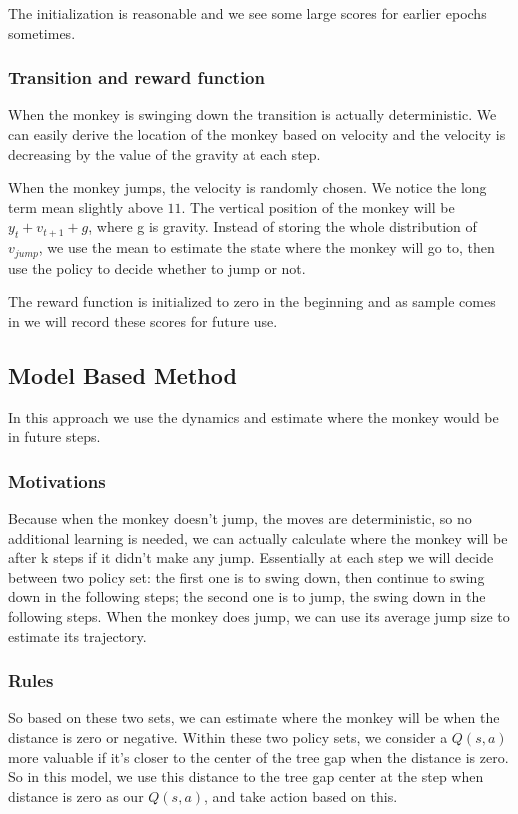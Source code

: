 \documentclass[submit]{harvardml}
\begin{document}
The initialization is reasonable and we see some large scores for earlier epochs sometimes.

\subsubsection{Transition and reward function}
When the monkey is swinging down the transition is actually deterministic. We can easily derive the location of the monkey based on velocity and the velocity is decreasing by the value of the gravity at each step. 

When the monkey jumps, the velocity is randomly chosen. We notice the long term mean slightly above $11$. The vertical position of the monkey will be $y_t + v_{t+1} + g$, where g is gravity. Instead of storing the whole distribution of $v_{jump}$, we use the mean to estimate the state where the monkey will go to, then use the policy to decide whether to jump or not.

The reward function is initialized to zero in the beginning and as sample comes in we will record these scores for future use.

\subsection{Model Based Method}
In this approach we use the dynamics and estimate where the monkey would be in future steps. 

\subsubsection{Motivations}
Because when the monkey doesn't jump, the moves are deterministic, so no additional learning is needed, we can actually calculate where the monkey will be after k steps if it didn't make any jump. Essentially at each step we will decide between two policy set: the first one is to swing down, then continue to swing down in the following steps; the second one is to jump, the swing down in the following steps. When the monkey does jump, we can use its average jump size to estimate its trajectory.

\subsubsection{Rules}
So based on these two sets, we can estimate where the monkey will be when the distance is zero or negative. Within these two policy sets, we consider a $Q(s,a)$ more valuable if it's closer to the center of the tree gap when the distance is zero. So in this model, we use this distance to the tree gap center at the step when distance is zero as our $Q(s,a)$, and take action based on this.
\end{document}
